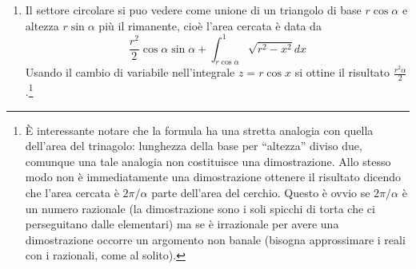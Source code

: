 \documentclass{report}
\begin{document}
\begin{enumerate}
\item Il settore circolare si puo vedere come unione di un triangolo
di base $r\cos\alpha$ e altezza $r\sin \alpha$ pi\`u il rimanente, cio\`e
l'area cercata \`e data da 
\[
\frac
{r^2}2\cos\alpha\sin\alpha+\int^{1}_{r\cos\alpha}\sqrt{r^2-x^2}dx
\]
Usando il cambio di variabile nell'integrale $z= r\cos x$ si ottine il
risultato $\frac{r^2\alpha}2$.\footnote{\`E interessante notare che la
formula ha una stretta analogia con quella dell'area del trinagolo:
lunghezza della base per ``altezza'' diviso due, comunque una tale
analogia non costituisce una dimostrazione. Allo stesso modo non \`e
immediatamente una dimostrazione ottenere il risultato dicendo che
l'area cercata \`e $2\pi/\alpha$  parte dell'area del cerchio. Questo
\`e ovvio se $2\pi/\alpha$ \`e un numero razionale (la dimostrazione
sono i soli spicchi di torta che ci perseguitano dalle elementari) ma
se \`e irrazionale per avere una dimostrazione occorre un argomento
non banale (bisogna approssimare i reali con i razionali, come al
solito).} 
\end{enumerate}
\end{document}
